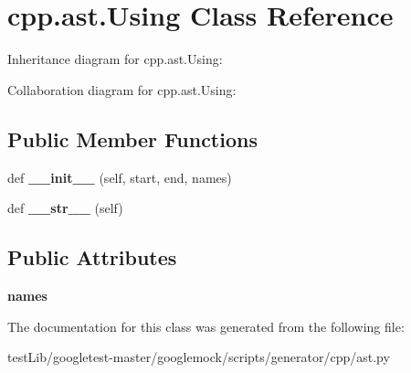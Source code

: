 \hypertarget{classcpp_1_1ast_1_1Using}{}\section{cpp.\+ast.\+Using Class Reference}
\label{classcpp_1_1ast_1_1Using}


Inheritance diagram for cpp.\+ast.\+Using\+:


Collaboration diagram for cpp.\+ast.\+Using\+:
\subsection*{Public Member Functions}
\begin{DoxyCompactItemize}
\item 
\mbox{\label{classcpp_1_1ast_1_1Using_a9b7a760a06d00f7211c889d9841e06af}} 
def {\bfseries \+\_\+\+\_\+init\+\_\+\+\_\+} (self, start, end, names)
\item 
\mbox{\label{classcpp_1_1ast_1_1Using_ac209e8e5d84988d14a8f4b30377e5455}} 
def {\bfseries \+\_\+\+\_\+str\+\_\+\+\_\+} (self)
\end{DoxyCompactItemize}
\subsection*{Public Attributes}
\begin{DoxyCompactItemize}
\item 
\mbox{\label{classcpp_1_1ast_1_1Using_abc05dedb59eb83857d373cc0e64eccb3}} 
{\bfseries names}
\end{DoxyCompactItemize}


The documentation for this class was generated from the following file\+:\begin{DoxyCompactItemize}
\item 
test\+Lib/googletest-\/master/googlemock/scripts/generator/cpp/ast.\+py\end{DoxyCompactItemize}
